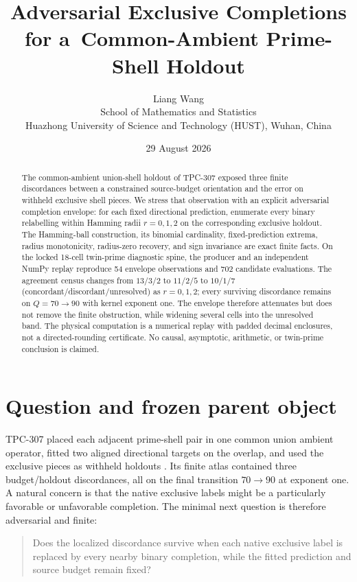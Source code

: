 \documentclass[11pt]{article}
\title{Adversarial Exclusive Completions for a\
Common-Ambient Prime-Shell Holdout}
\author{Liang Wang\\
School of Mathematics and Statistics\\
Huazhong University of Science and Technology (HUST), Wuhan, China}
\date{29 August 2026}
\begin{document}
\maketitle

\begin{abstract}
The common-ambient union-shell holdout of TPC-307 exposed three finite
discordances between a constrained source-budget orientation and the error
on withheld exclusive shell pieces.  We stress that observation with an
explicit adversarial completion envelope: for each fixed directional
prediction, enumerate every binary relabelling within Hamming radii
$r=0,1,2$ on the corresponding exclusive holdout.  The Hamming-ball
construction, its binomial cardinality, fixed-prediction extrema,
radius monotonicity, radius-zero recovery, and sign invariance are exact
finite facts.  On the locked 18-cell twin-prime diagnostic spine, the
producer and an independent NumPy replay reproduce 54 envelope observations
and 702 candidate evaluations.  The agreement census changes from
$13/3/2$ to $11/2/5$ to $10/1/7$ (concordant/discordant/unresolved) as
$r=0,1,2$; every surviving discordance remains on $Q=70\to90$ with
kernel exponent one.  The envelope therefore attenuates but does not remove
the finite obstruction, while widening several cells into the unresolved
band.  The physical computation is a numerical replay with padded decimal
enclosures, not a directed-rounding certificate.  No causal, asymptotic,
arithmetic, or twin-prime conclusion is claimed.
\end{abstract}

\section{Question and frozen parent object}

TPC-307 placed each adjacent prime-shell pair in one common union ambient
operator, fitted two aligned directional targets on the overlap, and used
the exclusive pieces as withheld holdouts \cite{tpc307}.  Its finite atlas
contained three budget/holdout discordances, all on the final transition
$70\to90$ at exponent one.  A natural concern is that the native exclusive
labels might be a particularly favorable or unfavorable completion.  The
minimal next question is therefore adversarial and finite:

\begin{quote}
Does the localized discordance survive when each native exclusive label is
replaced by every nearby binary completion, while the fitted prediction and
source budget remain fixed?
\end{quote}
\end{document}
